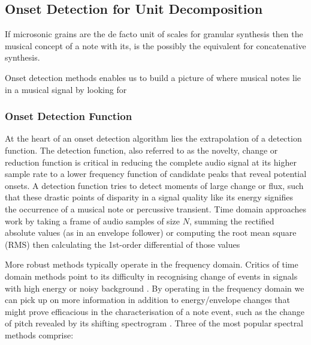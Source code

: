 \subsection{Onset Detection for Unit Decomposition}

If microsonic grains are the de facto unit of scales for granular synthesis then the musical concept of a note with its, is the possibly the equivalent for concatenative synthesis. 

Onset detection methods enables us to build a picture of where musical notes lie in a musical signal by looking for  

\subsubsection{Onset Detection Function}

At the heart of an onset detection algorithm lies the extrapolation of a detection function. The detection function, also referred to as the novelty, change or reduction function is critical in reducing the complete audio signal at its higher sample rate to a lower frequency function of candidate peaks that reveal potential onsets. A detection function tries to detect moments of large change or flux, such that these drastic points of disparity in a signal quality like its energy signifies the occurrence of a musical note or percussive transient. Time domain approaches work by taking a frame of audio samples of size $N$, summing the rectified absolute values (as in an envelope follower) or computing the root mean square (RMS) then calculating the 1st-order differential of those values \citep{Laroche2003, Duxbury2002}

More robust methods typically operate in the frequency domain. Critics of time domain methods point to its difficulty in recognising change of events in signals with high energy or noisy background \citep{Grzywczak2014, Eyben2010}. By operating in the frequency domain we can pick up on more information in addition to energy/envelope changes that might prove efficacious in the characterisation of a note event, such as the change of pitch revealed by its shifting spectrogram \citep{Schloss1985, Lerch2012}. Three of the most popular spectral methods comprise:

